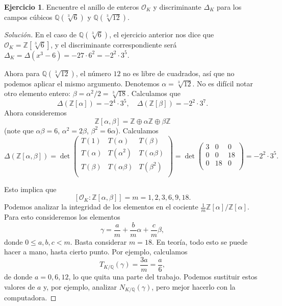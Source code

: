 \documentclass{article}
\newcounter{tarea}
\theoremstyle{definition}
\newtheorem{ejercicio}{Ejercicio}[tarea]
\newenvironment{solucion}{\begin{proof}[Solución]}{\end{proof}}
\newcommand{\ZZ}{\mathbb{Z}}
\newcommand{\QQ}{\mathbb{Q}}
\renewcommand{\O}{\mathcal{O}}
\begin{document}
\begin{ejercicio}
  Encuentre el anillo de enteros $\O_K$ y discriminante $\Delta_K$ para
  los campos cúbicos $\QQ (\sqrt[3]{6})$ y $\QQ (\sqrt[3]{12})$.

  \ifdefined\solutions
  \begin{solucion}
    En el caso de $\QQ (\sqrt[3]{6})$, el ejercicio anterior nos dice que
    $\O_K = \ZZ [\sqrt[3]{6}]$, y el discriminante correspondiente será
    $\Delta_K = \Delta (x^3 - 6) = -27\cdot 6^2 = -2^2\cdot 3^5$.

    Ahora para $\QQ (\sqrt[3]{12})$, el número $12$ no es libre de cuadrados,
    así que no podemos aplicar el mismo argumento. Denotemos
    $\alpha = \sqrt[3]{12}$. No es difícil notar otro elemento entero:
    $\beta = \alpha^2/2 = \sqrt[3]{18}$. Calculamos que
    \[ \Delta (\ZZ [\alpha]) = -2^4\cdot 3^5, \quad
       \Delta (\ZZ [\beta]) = -2^2\cdot 3^7. \]
    Ahora consideremos
    $$\ZZ [\alpha,\beta] = \ZZ \oplus \alpha\ZZ \oplus \beta\ZZ$$
    (note que $\alpha\beta = 6$, $\alpha^2 = 2\beta$, $\beta^2 = 6\alpha$).
    Calculamos
    \[ \Delta (\ZZ [\alpha,\beta]) = \det \begin{pmatrix}
      T (1) & T (\alpha) & T (\beta) \\
      T (\alpha) & T (\alpha^2) & T (\alpha\beta) \\
      T (\beta) & T (\alpha\beta) & T (\beta^2) \\
    \end{pmatrix} = \det \begin{pmatrix}
      3 & 0 & 0 \\
      0 & 0 & 18 \\
      0 & 18 & 0 \\
    \end{pmatrix} = -2^2\cdot 3^5. \]

    Esto implica que
    $$[\O_K : \ZZ [\alpha,\beta]] = m = 1, 2, 3, 6, 9, 18.$$
    Podemos analizar la integridad de los elementos en el cociente
    $\frac{1}{m}\ZZ[\alpha]/\ZZ[\alpha]$. Para esto consideremos los elementos
    $$\gamma = \frac{a}{m} + \frac{b}{m}\alpha + \frac{c}{m}\beta,$$
    donde $0 \le a,b,c < m$. Basta considerar $m = 18$. En teoría, todo esto se
    puede hacer a mano, hasta cierto punto. Por ejemplo, calculamos
    $$T_{K/\QQ} (\gamma) = \frac{3a}{m} = \frac{a}{6},$$
    de donde $a = 0,6,12$, lo que quita una parte del trabajo. Podemos
    sustituir estos valores de $a$ y, por ejemplo, analizar $N_{K/\QQ} (\gamma)$,
    pero mejor hacerlo con la computadora.


\end{solucion}
\end{ejercicio}
\end{document}
